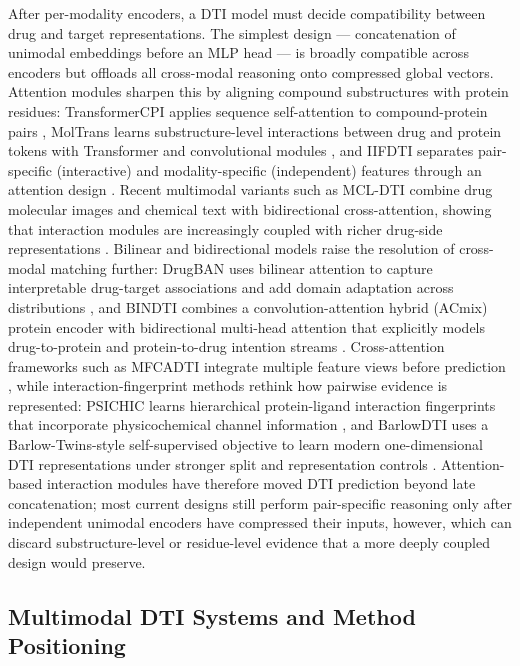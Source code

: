 After per-modality encoders, a DTI model must decide compatibility between drug and target representations.
The simplest design --- concatenation of unimodal embeddings before an MLP head --- is broadly compatible
across encoders but offloads all cross-modal reasoning onto compressed global vectors. Attention modules
sharpen this by aligning compound substructures with protein residues: TransformerCPI applies sequence
self-attention to compound-protein pairs \citep{chen2020transformercpi}, MolTrans learns substructure-level
interactions between drug and protein tokens with Transformer and convolutional modules
\citep{huang2021moltrans}, and IIFDTI separates pair-specific (interactive) and modality-specific
(independent) features through an attention design \citep{cheng2022iifdti}. Recent multimodal variants such
as MCL-DTI combine drug molecular images and chemical text with bidirectional cross-attention, showing that
interaction modules are increasingly coupled with richer drug-side representations \citep{qian2023mcldti}.
Bilinear and bidirectional models raise the resolution of cross-modal matching further: DrugBAN uses bilinear
attention to capture interpretable drug-target associations and add domain adaptation across distributions
\citep{bai2023drugban}, and BINDTI combines a convolution-attention hybrid (ACmix) protein encoder with
bidirectional multi-head attention that explicitly models drug-to-protein and protein-to-drug intention
streams \citep{peng2024bindti}. Cross-attention frameworks such as MFCADTI integrate multiple feature
views before prediction \citep{quan2025mfcadti}, while interaction-fingerprint methods rethink how pairwise
evidence is represented: PSICHIC learns hierarchical protein-ligand interaction fingerprints that incorporate
physicochemical channel information \citep{koh2024psichic}, and BarlowDTI uses a Barlow-Twins-style
self-supervised objective to learn modern one-dimensional DTI representations under stronger split and
representation controls \citep{schuh2025barlowdti}. Attention-based interaction modules have therefore
moved DTI prediction beyond late concatenation; most current designs still perform pair-specific reasoning
only after independent unimodal encoders have compressed their inputs, however, which can discard
substructure-level or residue-level evidence that a more deeply coupled design would preserve.

\subsection{Multimodal DTI Systems and Method Positioning}

